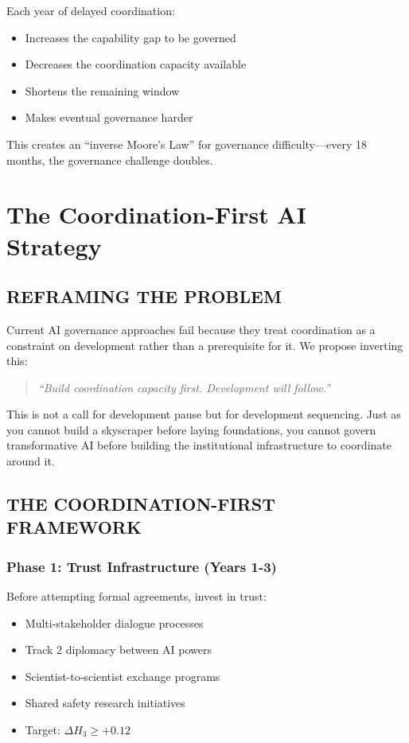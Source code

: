 \documentclass[11pt,letterpaper]{article}
\begin{document}
Each year of delayed coordination:
\begin{itemize}
\item Increases the capability gap to be governed
\item Decreases the coordination capacity available
\item Shortens the remaining window
\item Makes eventual governance harder
\end{itemize}

This creates an ``inverse Moore's Law'' for governance difficulty---every 18 months, the governance challenge doubles.

\section{The Coordination-First AI Strategy}

\subsection{REFRAMING THE PROBLEM}

Current AI governance approaches fail because they treat coordination as a constraint on development rather than a prerequisite for it. We propose inverting this:

\begin{quote}
\textit{``Build coordination capacity first. Development will follow.''}
\end{quote}

This is not a call for development pause but for development sequencing. Just as you cannot build a skyscraper before laying foundations, you cannot govern transformative AI before building the institutional infrastructure to coordinate around it.

\subsection{THE COORDINATION-FIRST FRAMEWORK}

\subsubsection{Phase 1: Trust Infrastructure (Years 1-3)}

Before attempting formal agreements, invest in trust:
\begin{itemize}
\item Multi-stakeholder dialogue processes
\item Track 2 diplomacy between AI powers
\item Scientist-to-scientist exchange programs
\item Shared safety research initiatives
\item Target: $\Delta H_3 \geq +0.12$
\end{itemize}
\end{document}
